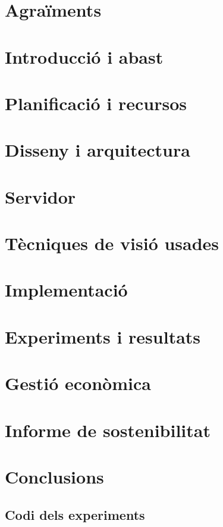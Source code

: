 \documentclass[a4paper,12pt]{report}
\begin{document}
	\chapter*{Agraïments}
	

	\tableofcontents
	\chapter{Introducció i abast}
	
	\chapter{Planificació i recursos}
	
	\chapter{Disseny i arquitectura}
	
	\chapter{Servidor}
	
	\chapter{Tècniques de visió usades}
	
	\chapter{Implementació}
	
	\chapter{Experiments i resultats}
	
	\chapter{Gestió econòmica}
	
	\chapter{Informe de sostenibilitat}
	
	\chapter{Conclusions}
	

	\begin{appendices}
		\chapter{Codi dels experiments}
		\label{appendix:proves}
		
	\end{appendices}

	\printbibliography[heading=bibintoc]
	\cleardoublepage{}
	\listoftables
	\cleardoublepage{}
	\listoffigures
\end{document}
